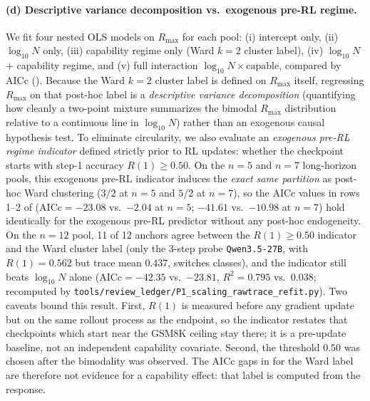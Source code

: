 \paragraph{(d) Descriptive variance decomposition vs.\ exogenous pre-RL regime.}
\label{par:scaling-iter133-class}
We fit four nested OLS models on $R_{\max}$ for each pool: (i)
intercept only, (ii) $\log_{10} N$ only, (iii) capability regime
only (Ward $k=2$ cluster label), (iv) $\log_{10} N$ + capability
regime, and (v) full interaction $\log_{10} N \times \text{capable}$,
compared by AICc ().  Because the
Ward $k=2$ cluster label is defined on $R_{\max}$ itself, regressing
$R_{\max}$ on that post-hoc label is a \emph{descriptive variance
decomposition} (quantifying how cleanly a two-point mixture summarizes
the bimodal $R_{\max}$ distribution relative to a continuous line in
$\log_{10} N$) rather than an exogenous causal hypothesis test.  To
eliminate circularity, we also evaluate an \emph{exogenous pre-RL
regime indicator} defined strictly prior to RL updates: whether the
checkpoint starts with step-1 accuracy $R(1) \ge 0.50$.  On the $n=5$
and $n=7$ long-horizon pools, this exogenous pre-RL indicator induces
the \emph{exact same partition} as post-hoc Ward clustering ($3/2$ at
$n=5$ and $5/2$ at $n=7$), so the AICc values in rows 1--2 of
 ($\mathrm{AICc} = -23.08$ vs.\
$-2.04$ at $n=5$; $-41.61$ vs.\ $-10.98$ at $n=7$) hold identically
for the exogenous pre-RL predictor without any post-hoc endogeneity.
On the $n=12$ pool, 11 of 12 anchors agree between the
$R(1) \ge 0.50$ indicator and the Ward cluster label (only the
3-step probe \texttt{Qwen3.5-27B}, with $R(1)=0.562$ but trace mean
$0.437$, switches classes), and the indicator still beats
$\log_{10} N$ alone ($\mathrm{AICc} = -42.35$ vs.\ $-23.81$,
$R^2 = 0.795$ vs.\ $0.038$; recomputed by \texttt{tools/review\_ledger/P1\_scaling\_rawtrace\_refit.py}).
Two caveats bound this result.  First, $R(1)$ is measured before any
gradient update but on the same rollout process as the endpoint, so
the indicator restates that checkpoints which start near the GSM8K
ceiling stay there; it is a pre-update baseline, not an independent
capability covariate.  Second, the threshold $0.50$ was chosen after
the bimodality was observed.  The AICc gaps in
 for the Ward label are therefore
not evidence for a capability effect: that label is computed from the
response.

